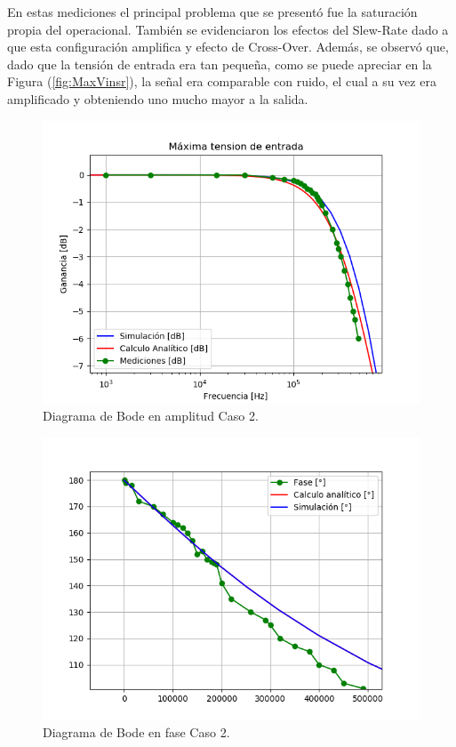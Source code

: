 En estas mediciones el principal problema que se presentó fue la saturación propia del operacional. También se evidenciaron los efectos del Slew-Rate dado a que esta configuración amplifica y efecto de Cross-Over. Además, se observó que, dado que la tensión de entrada era tan pequeña, como se puede apreciar en la Figura (\ref{fig:MaxVinsr}), la señal era comparable con ruido, el cual a su vez era amplificado y obteniendo uno mucho mayor a la salida.
\begin{figure}[H]	
	\centering
	\includegraphics[width=\textwidth]{Ejercicio1/Imagenes/BodeC2.png}
	\caption{Diagrama de Bode en amplitud Caso 2.}
	\label{fig:BodeC2}
\end{figure} 
\begin{figure}[H]	
	\centering
	\includegraphics[width=\textwidth]{Ejercicio1/Imagenes/BodephC2.png}
	\caption{Diagrama de Bode en fase Caso 2.}
	\label{fig:BodephC2}
\end{figure} 

